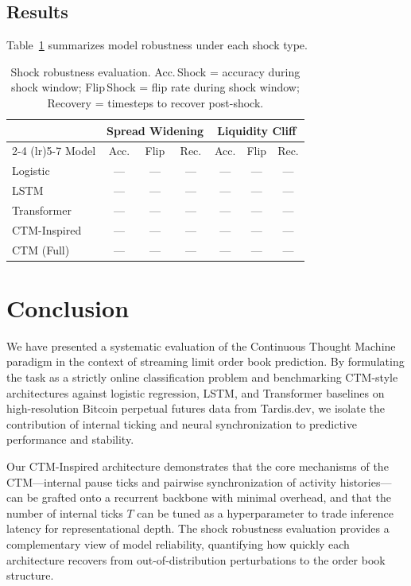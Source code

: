 \documentclass[11pt]{article}
\begin{document}
\subsection{Results}

Table~\ref{tab:shock_results} summarizes model robustness under each shock type.

\begin{table}[h]
\centering
\caption{Shock robustness evaluation. Acc.\,Shock = accuracy during shock window;
         Flip\,Shock = flip rate during shock window;
         Recovery = timesteps to recover post-shock.}
\label{tab:shock_results}
\begin{tabular}{lcccccc}
  \toprule
  & \multicolumn{3}{c}{Spread Widening} & \multicolumn{3}{c}{Liquidity Cliff} \\
  \cmidrule(lr){2-4} \cmidrule(lr){5-7}
  Model         & Acc. & Flip & Rec. & Acc. & Flip & Rec. \\
  \midrule
  Logistic      & ---  & ---  & ---  & ---  & ---  & ---  \\
  LSTM          & ---  & ---  & ---  & ---  & ---  & ---  \\
  Transformer   & ---  & ---  & ---  & ---  & ---  & ---  \\
  CTM-Inspired  & ---  & ---  & ---  & ---  & ---  & ---  \\
  CTM (Full)    & ---  & ---  & ---  & ---  & ---  & ---  \\
  \bottomrule
\end{tabular}
\end{table}

\section{Conclusion}
\label{sec:conclusion}

We have presented a systematic evaluation of the Continuous Thought Machine
paradigm in the context of streaming limit order book prediction. By formulating
the task as a strictly online classification problem and benchmarking CTM-style
architectures against logistic regression, LSTM, and Transformer baselines on
high-resolution Bitcoin perpetual futures data from Tardis.dev, we isolate the
contribution of internal ticking and neural synchronization to predictive
performance and stability.

Our CTM-Inspired architecture demonstrates that the core mechanisms of the
CTM---internal pause ticks and pairwise synchronization of activity histories---
can be grafted onto a recurrent backbone with minimal overhead, and that the
number of internal ticks $T$ can be tuned as a hyperparameter to trade
inference latency for representational depth. The shock robustness evaluation
provides a complementary view of model reliability, quantifying how quickly
each architecture recovers from out-of-distribution perturbations to the
order book structure.
\end{document}
